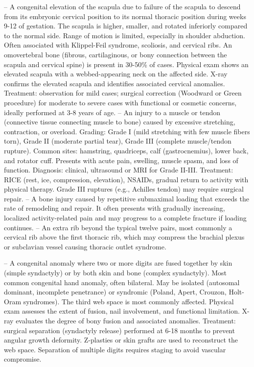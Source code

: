 -- A congenital elevation of the scapula due to failure of the scapula to descend from its embryonic cervical position to its normal thoracic position during weeks 9-12 of gestation. The scapula is higher, smaller, and rotated inferiorly compared to the normal side. Range of motion is limited, especially in shoulder abduction. Often associated with Klippel-Feil syndrome, scoliosis, and cervical ribs. An omovertebral bone (fibrous, cartilaginous, or bony connection between the scapula and cervical spine) is present in 30-50\% of cases. Physical exam shows an elevated scapula with a webbed-appearing neck on the affected side. X-ray confirms the elevated scapula and identifies associated cervical anomalies. Treatment: observation for mild cases; surgical correction (Woodward or Green procedure) for moderate to severe cases with functional or cosmetic concerns, ideally performed at 3-8 years of age.
-- An injury to a muscle or tendon (connective tissue connecting muscle to bone) caused by excessive stretching, contraction, or overload. Grading: Grade I (mild stretching with few muscle fibers torn), Grade II (moderate partial tear), Grade III (complete muscle/tendon rupture). Common sites: hamstring, quadriceps, calf (gastrocnemius), lower back, and rotator cuff. Presents with acute pain, swelling, muscle spasm, and loss of function. Diagnosis: clinical, ultrasound or MRI for Grade II-III. Treatment: RICE (rest, ice, compression, elevation), NSAIDs, gradual return to activity with physical therapy. Grade III ruptures (e.g., Achilles tendon) may require surgical repair.
-- A bone injury caused by repetitive submaximal loading that exceeds the rate of remodeling and repair. It often presents with gradually increasing, localized activity-related pain and may progress to a complete fracture if loading continues.
-- An extra rib beyond the typical twelve pairs, most commonly a cervical rib above the first thoracic rib, which may compress the brachial plexus or subclavian vessel causing thoracic outlet syndrome.

-- A congenital anomaly where two or more digits are fused together by skin (simple syndactyly) or by both skin and bone (complex syndactyly). Most common congenital hand anomaly, often bilateral. May be isolated (autosomal dominant, incomplete penetrance) or syndromic (Poland, Apert, Crouzon, Holt-Oram syndromes). The third web space is most commonly affected. Physical exam assesses the extent of fusion, nail involvement, and functional limitation. X-ray evaluates the degree of bony fusion and associated anomalies. Treatment: surgical separation (syndactyly release) performed at 6-18 months to prevent angular growth deformity. Z-plasties or skin grafts are used to reconstruct the web space. Separation of multiple digits requires staging to avoid vascular compromise.


